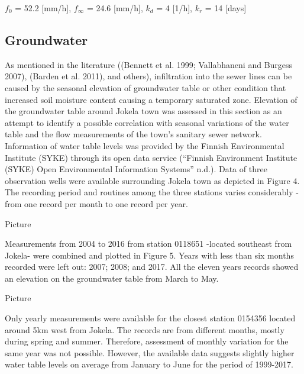 \begin{center}
  $f_0$ = 52.2 [mm/h], $f_\infty$ = 24.6 [mm/h], $k_d$ = 4 [1/h], $k_r$ = 14 [days]  
\end{center}





\subsection{Groundwater} \label{gwcs}

As mentioned in the literature ((Bennett et al. 1999; Vallabhaneni and Burgess 2007), (Barden et al. 2011), and others), infiltration into the sewer lines can be caused by the seasonal elevation of groundwater table or other condition that increased soil moisture content causing a temporary saturated zone. Elevation of the groundwater table around Jokela town was assessed in this section as an attempt to identify a possible correlation with seasonal variations of the water table and the flow measurements of the town’s sanitary sewer network. 
Information of water table levels was provided by the Finnish Environmental Institute (SYKE) through its open data service (“Finnish Environment Institute (SYKE) Open Environmental Information Systems” n.d.). Data of three observation wells were available surrounding Jokela town as depicted in Figure 4. The recording period and routines among the three stations varies considerably - from one record per month to one record per year.

Picture

Measurements from 2004 to 2016 from station 0118651 -located southeast from Jokela- were combined and plotted in Figure 5. Years with less than six months recorded were left out: 2007; 2008; and 2017. All the eleven years records showed an elevation on the groundwater table from March to May. 

Picture

Only yearly measurements were available for the closest station 0154356 located around 5km west from Jokela. The records are from different months, mostly during spring and summer. Therefore, assessment of monthly variation for the same year was not possible. However, the available data suggests slightly higher water table levels on average from January to June for the period of 1999-2017.

